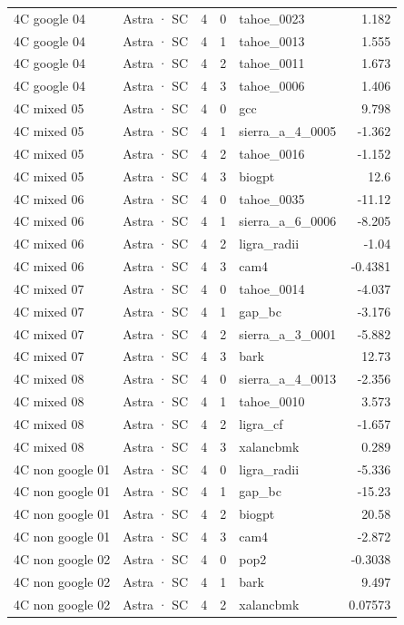 \begin{tabular}{llrrlr}
4C google 04 & Astra · SC & 4 & 0 & tahoe\_0023 & 1.182 \\
4C google 04 & Astra · SC & 4 & 1 & tahoe\_0013 & 1.555 \\
4C google 04 & Astra · SC & 4 & 2 & tahoe\_0011 & 1.673 \\
4C google 04 & Astra · SC & 4 & 3 & tahoe\_0006 & 1.406 \\
4C mixed 05 & Astra · SC & 4 & 0 & gcc & 9.798 \\
4C mixed 05 & Astra · SC & 4 & 1 & sierra\_a\_4\_0005 & -1.362 \\
4C mixed 05 & Astra · SC & 4 & 2 & tahoe\_0016 & -1.152 \\
4C mixed 05 & Astra · SC & 4 & 3 & biogpt & 12.6 \\
4C mixed 06 & Astra · SC & 4 & 0 & tahoe\_0035 & -11.12 \\
4C mixed 06 & Astra · SC & 4 & 1 & sierra\_a\_6\_0006 & -8.205 \\
4C mixed 06 & Astra · SC & 4 & 2 & ligra\_radii & -1.04 \\
4C mixed 06 & Astra · SC & 4 & 3 & cam4 & -0.4381 \\
4C mixed 07 & Astra · SC & 4 & 0 & tahoe\_0014 & -4.037 \\
4C mixed 07 & Astra · SC & 4 & 1 & gap\_bc & -3.176 \\
4C mixed 07 & Astra · SC & 4 & 2 & sierra\_a\_3\_0001 & -5.882 \\
4C mixed 07 & Astra · SC & 4 & 3 & bark & 12.73 \\
4C mixed 08 & Astra · SC & 4 & 0 & sierra\_a\_4\_0013 & -2.356 \\
4C mixed 08 & Astra · SC & 4 & 1 & tahoe\_0010 & 3.573 \\
4C mixed 08 & Astra · SC & 4 & 2 & ligra\_cf & -1.657 \\
4C mixed 08 & Astra · SC & 4 & 3 & xalancbmk & 0.289 \\
4C non google 01 & Astra · SC & 4 & 0 & ligra\_radii & -5.336 \\
4C non google 01 & Astra · SC & 4 & 1 & gap\_bc & -15.23 \\
4C non google 01 & Astra · SC & 4 & 2 & biogpt & 20.58 \\
4C non google 01 & Astra · SC & 4 & 3 & cam4 & -2.872 \\
4C non google 02 & Astra · SC & 4 & 0 & pop2 & -0.3038 \\
4C non google 02 & Astra · SC & 4 & 1 & bark & 9.497 \\
4C non google 02 & Astra · SC & 4 & 2 & xalancbmk & 0.07573 \\

\end{tabular}
